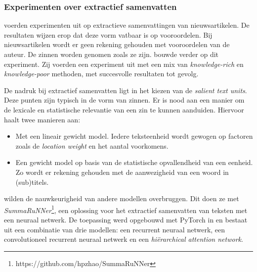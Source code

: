 
\subsubsection{Experimenten over extractief samenvatten}


\textcite{McKeown1999} voerden experimenten uit op extractieve samenvattingen van nieuwsartikelen. De resultaten wijzen erop dat deze vorm vatbaar is op vooroordelen. Bij nieuwsartikelen wordt er geen rekening gehouden met vooroordelen van de auteur. De zinnen worden genomen zoals ze zijn. \textcite{Hahn2000} bouwde verder op dit experiment. Zij voerden een experiment uit met een mix van \textit{knowledge-rich} en \textit{knowledge-poor} methoden, met succesvolle resultaten tot gevolg.

De nadruk bij extractief samenvatten ligt in het kiezen van de \textit{salient text units}. Deze punten zijn typisch in de vorm van zinnen. Er is nood aan een manier om de lexicale en statistische relevantie van een zin te kunnen aanduiden. Hiervoor haalt \textcite{Hahn2000} twee manieren aan:

\begin{itemize}
	\item Met een lineair gewicht model. Iedere teksteenheid wordt gewogen op factoren zoals de \textit{location weight} en het aantal voorkomens.
	\item Een gewicht model op basis van de statistische opvallendheid van een eenheid. Zo wordt er rekening gehouden met de aanwezigheid van een woord in (sub)titels.
\end{itemize}


\textcite{Nallapati2017} wilden de nauwkeurigheid van andere modellen overbruggen. Dit doen ze met \textit{SummaRuNNer}\footnote{https://github.com/hpzhao/SummaRuNNer}, een oplossing voor het extractief samenvatten van teksten met een neuraal netwerk. De toepassing werd opgebouwd met PyTorch in  en bestaat uit een combinatie van drie modellen: een recurrent neuraal netwerk, een convolutioneel recurrent neuraal netwerk en een \textit{hiërarchical attention network}.


